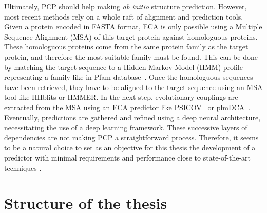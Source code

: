     Ultimately, PCP should help making \textit{ab initio} structure prediction.
    However, most recent methods rely on a whole raft of alignment and prediction tools.
    Given a protein encoded in FASTA format, ECA is only possible using a Multiple Sequence Alignment (MSA)
    of this target protein against homologuous proteins. These homologuous proteins come from the same protein family
    as the target protein, and therefore the most suitable family must be found.
    This can be done by matching the target sequence to a Hidden Markov Model (HMM) profile representing a family
    like in Pfam database~\cite{Pfam}. Once the homologuous sequences have been retrieved, they have to be aligned to
    the target sequence using an MSA tool like HHblits or HMMER. In the next step, evolutionary couplings are extracted from
    the MSA using an ECA predictor like PSICOV~\cite{doi:10.1093/bioinformatics/btr638} or plmDCA~\cite{EKEBERG2014341}.
    Eventually, predictions are gathered and refined using a deep neural architecture, necessitating the use
    of a deep learning framework. These successive layers of dependencies are not making PCP a straightforward process.
    Therefore, it seems to be a natural choice to set as an objective for this thesis the development of a predictor with
    minimal requirements and performance close to state-of-the-art techniques
    \cite{RaptorX, DeepContact, doi:10.1093/bioinformatics/bty341, Michel383133, DeepMind}.

\section{Structure of the thesis}

